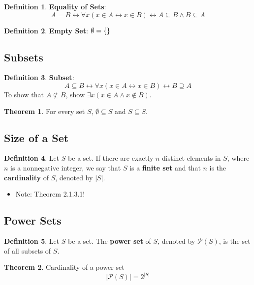 \documentclass[article, 12pt]{article}
\theoremstyle{definition}
\newtheorem{theorem}{Theorem}[subsection]
\newtheorem{definition}{Definition}[subsection]
\DeclarePairedDelimiter\set{\{}{\}}
\newcommand{\powset}{\mathcal{P}} %
\newcommand{\lra}{\leftrightarrow} %
\begin{document}
    \begin{definition}
        \textbf{Equality of Sets}:
        \begin{equation*}
            A=B \lra \forall x (x \in A \lra x \in B) \lra A \subseteq B \land B \subseteq A   
        \end{equation*}
    \end{definition}

    \begin{definition}
        \textbf{Empty Set}: $\emptyset = \set*{}$
    \end{definition}
    \subsection{Subsets}
    \begin{definition}
        \textbf{Subset}:
        \begin{equation*}
            A \subseteq B \lra \forall x (x \in A \lra x \in B) \lra B \supseteq A
        \end{equation*}
        To show that $A \not\subseteq B$, show $\exists x (x \in A \land x \not\in B)$.
    \end{definition}

    \begin{theorem}
        For every set $S$, $\emptyset \subseteq S$ and $S \subseteq S$.
    \end{theorem}
    \subsection{Size of a Set}
    \begin{definition}
        Let $S$ be a set. If there are exactly $n$ distinct elements in $S$, where $n$ is a nonnegative integer, we say that $S$ is a \textbf{finite set} and that $n$ is the \textbf{cardinality} of $S$, denoted by $|S|$.
        \begin{itemize}
            \item Note: Theorem 2.1.3.1!
        \end{itemize}
    \end{definition}
    \subsection{Power Sets}
    \begin{definition}
        Let $S$ be a set. The \textbf{power set} of $S$, denoted by $\powset(S)$, is the set of all subsets of $S$.
    \end{definition}
    \begin{theorem} Cardinality of a power set
        \begin{equation*}
            |\powset(S)| = 2^{|S|}
        \end{equation*}
    \end{theorem}
\end{document}
